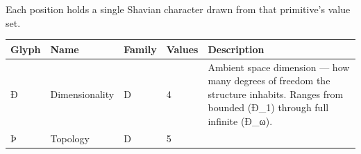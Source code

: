 \documentclass[12pt,a4paper]{article}
\begin{document}
Each position holds a single Shavian character drawn from that
primitive's value set.

\begin{longtable}[]{@{}lllll@{}}
\toprule
\begin{minipage}[b]{0.14\columnwidth}\raggedright
Glyph\strut
\end{minipage} & \begin{minipage}[b]{0.12\columnwidth}\raggedright
Name\strut
\end{minipage} & \begin{minipage}[b]{0.16\columnwidth}\raggedright
Family\strut
\end{minipage} & \begin{minipage}[b]{0.16\columnwidth}\raggedright
Values\strut
\end{minipage} & \begin{minipage}[b]{0.27\columnwidth}\raggedright
Description\strut
\end{minipage}\tabularnewline
\midrule
\endhead
\begin{minipage}[t]{0.14\columnwidth}\raggedright
Ð\strut
\end{minipage} & \begin{minipage}[t]{0.12\columnwidth}\raggedright
Dimensionality\strut
\end{minipage} & \begin{minipage}[t]{0.16\columnwidth}\raggedright
D\strut
\end{minipage} & \begin{minipage}[t]{0.16\columnwidth}\raggedright
4\strut
\end{minipage} & \begin{minipage}[t]{0.27\columnwidth}\raggedright
Ambient space dimension --- how many degrees of freedom the structure
inhabits. Ranges from bounded (Ð\_1) through full infinite (Ð\_ω).\strut
\end{minipage}\tabularnewline
\begin{minipage}[t]{0.14\columnwidth}\raggedright
Þ\strut
\end{minipage} & \begin{minipage}[t]{0.12\columnwidth}\raggedright
Topology\strut
\end{minipage} & \begin{minipage}[t]{0.16\columnwidth}\raggedright
D\strut
\end{minipage} & \begin{minipage}[t]{0.16\columnwidth}\raggedright
5\strut
\end{minipage} & \begin{minipage}[t]{0.27\columnwidth}\raggedright

\end{minipage}
\end{longtable}
\end{document}
